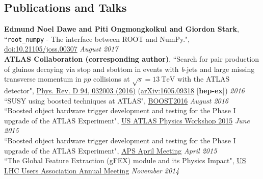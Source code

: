 \documentclass[margin,line]{resume}
\let\origsection\section%
\let\section\subsection%
\let\section\origsection%
\begin{document}
\begin{resume}
\section{\mysidestyle Publications and Talks}

\textbf{Edmund Noel Dawe and Piti Ongmongkolkul and Giordon Stark}, ``\texttt{root\_numpy} - The interface between ROOT and NumPy.", \href{http://joss.theoj.org/papers/10.21105/joss.00307}{doi:10.21105/joss.00307} \hfill \textsl{August 2017}\vspace{-5mm}\\%

\textbf{ATLAS Collaboration (corresponding author)}, ``Search for pair production of gluinos decaying via stop and sbottom in events with \textsl{b}-jets and large missing transverse momentum in $pp$ collisions at $\sqrt{s}=13\ \mathrm{TeV}$ with the ATLAS detector", \href{https://journals.aps.org/prd/abstract/10.1103/PhysRevD.94.032003}{Phys. Rev. D 94, 032003 (2016)} (\href{https://arxiv.org/abs/1605.09318}{arXiv:1605.09318} \textbf{[hep-ex]}) \hfill \textsl{2016}\vspace{1mm}\\%

``SUSY using boosted techniques at ATLAS", \href{https://indico.cern.ch/event/439039}{BOOST2016} \hfill \textsl{August 2016}\vspace{1mm}\\%
``Boosted object hardware trigger development and testing for the Phase I upgrade of the ATLAS Experiment", \href{https://indico.cern.ch/event/388328/timetable/?view=standard}{US ATLAS Physics Workshop 2015} \hfill \textsl{June 2015}\vspace{1mm}\\%
``Boosted object hardware trigger development and testing for the Phase I upgrade of the ATLAS Experiment", \href{http://meetings.aps.org/Meeting/APR15/Session/C16.6}{APS April Meeting} \hfill \textsl{April 2015}\vspace{1mm}\\%
``The Global Feature Extraction (gFEX) module and its Physics Impact", \href{https://indico.hep.anl.gov/indico/conferenceDisplay.py?confId=410}{US LHC Users Association Annual Meeting} \hfill \textsl{November 2014}\vspace{1mm}\\%


\end{resume}
\end{document}
